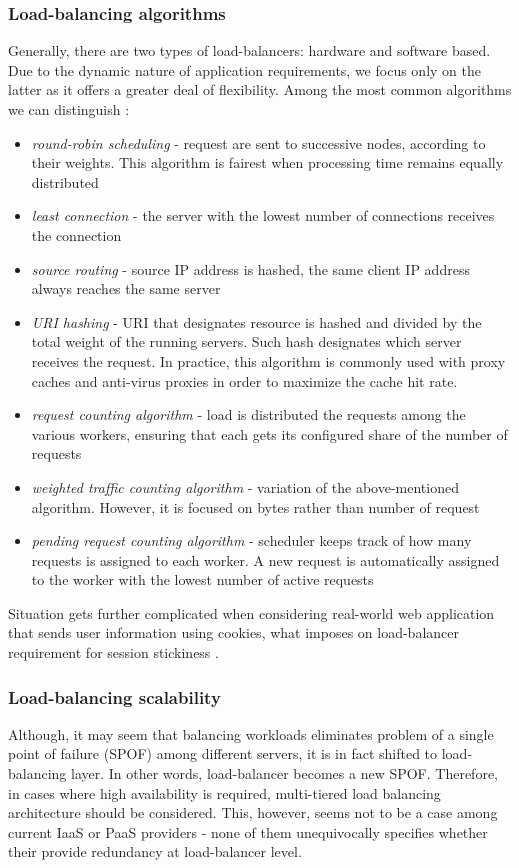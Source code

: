 \subsubsection{Load-balancing algorithms}
Generally, there are two types of load-balancers: hardware and software based. Due to the dynamic nature of application requirements, we focus only on the latter as it offers a greater deal of flexibility. Among the most common algorithms we can distinguish \cite{HaProxyDoc}:
\begin{itemize}
 \item \textit{round-robin scheduling} - request are sent to successive nodes, according to their weights. This algorithm is fairest when processing time remains equally distributed \cite{HaProxyDoc}
 \item \textit{least connection} - the server with the lowest number of connections receives the connection
 \item \textit{source routing} - source IP address is hashed, the same client IP address always reaches the same server
 \item \textit{URI hashing} - URI that designates resource is hashed and divided by the total weight of the running servers. Such hash designates which server receives the request. In practice, this algorithm is commonly used with proxy caches and anti-virus proxies in order to maximize the cache hit rate.
 \item \textit{request counting algorithm} - load is distributed the requests among the various workers, ensuring that each gets its configured share of the number of requests
 \item \textit{weighted traffic counting algorithm} - variation of the above-mentioned algorithm. However, it is focused on bytes rather than number of request
 \item \textit{pending request counting algorithm} - scheduler keeps track of how many requests is assigned to each worker. A new request is automatically assigned to the worker with the lowest number of active requests
\end{itemize}

Situation gets further complicated when considering real-world web application that sends user information using cookies, what imposes on load-balancer requirement for session stickiness \cite{StBaMa11}. 

\subsubsection{Load-balancing scalability}
Although, it may seem that balancing workloads eliminates problem of a single point of failure (SPOF) among different servers, it is in fact shifted to load-balancing layer. In other words, load-balancer becomes a new SPOF. Therefore, in cases where high availability is required, multi-tiered load balancing architecture should be considered. This, however, seems not to be a case among current IaaS or PaaS providers - none of them unequivocally specifies whether their provide redundancy at load-balancer level.

